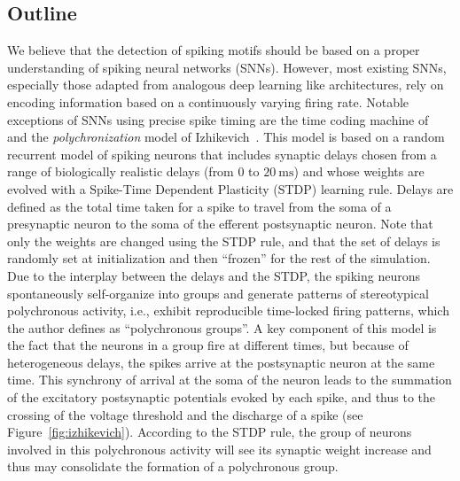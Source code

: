 \documentclass[runningheads]{llncs}
\newcommand{\ms}{\si{\milli\second}}%
\begin{document}
\subsection{Outline}
%
We believe that the detection of spiking motifs should be based on a proper understanding of spiking neural networks (SNNs). However, most existing SNNs, especially those adapted from analogous deep learning like architectures, rely on encoding information based on a continuously varying firing rate. Notable exceptions of SNNs using precise spike timing are the time coding machine of~\cite{lazar_time_2004} and the \textit{polychronization} model of Izhikevich~\cite{izhikevich_polychronization_2006}.  This model  is based on a random recurrent model of spiking neurons that includes synaptic delays chosen from a range of biologically realistic delays (from $0$ to $20~\ms$) and whose weights are evolved with a Spike-Time Dependent Plasticity (STDP) learning rule. Delays are defined as the total time taken for a spike to travel from the soma of a presynaptic neuron to the soma of the efferent postsynaptic neuron. Note that only the weights are changed using the STDP rule, and that the set of delays is randomly set at initialization and then ``frozen'' for the rest of the simulation. Due to the interplay between the delays and the STDP, the spiking neurons spontaneously self-organize into groups and generate patterns of stereotypical polychronous activity, i.e., exhibit reproducible time-locked firing patterns, which the author defines as ``polychronous groups''. A key component of this model is the fact that the neurons in a group fire at different times, but because of heterogeneous delays, the spikes arrive at the postsynaptic neuron at the same time. This synchrony of arrival at the soma of the neuron leads to the summation of the excitatory postsynaptic potentials evoked by each spike, and thus to the crossing of the voltage threshold and the discharge of a spike (see Figure~\ref{fig:izhikevich}). According to the STDP rule, the group of neurons involved in this polychronous activity will see its synaptic weight increase and thus may consolidate the formation of a polychronous group. 
\end{document}
